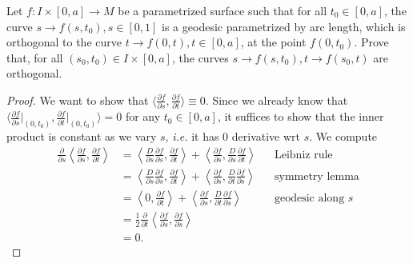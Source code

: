 \documentclass[12pt]{article}
\begin{document}
\begin{problem}[do Carmo 3.10]
	Let $ f: I \times [0,a] \to M$ be a parametrized surface such that for all $ t_0 \in [0,a]$, the curve $ s \to f(s,t_0), s \in [0,1]$ is a geodesic parametrized by arc length, which is orthogonal to the curve $ t \to f(0,t), t \in [0,a]$, at the point $ f(0,t_0)$. Prove that, for all $ (s_0,t_0) \in I \times [0,a]$, the curves $ s \to f(s,t_0), t \to f(s_0,t)$ are orthogonal.
\end{problem}

\begin{proof}
	We want to show that $ \langle \frac{\partial f}{\partial s} , \frac{\partial f}{\partial t}  \rangle \equiv 0$. Since we already know that $ \langle \frac{\partial f}{\partial s} \big|_{(0,t_0)} , \frac{\partial f}{\partial t} \big|_{(0,t_0)}  \rangle = 0$ for any $ t_0 \in [0,a]$, it suffices to show that the inner product is constant as we vary $ s$,  \emph{i.e.} it has 0 derivative wrt $ s$. We compute
\begin{align*}
	\frac{\partial }{\partial s} \left\langle \frac{\partial f}{\partial s} , \frac{\partial f}{\partial t} \right \rangle &= \left\langle \frac{D}{\partial s} \frac{\partial f}{\partial s}, \frac{\partial f}{\partial t}   \right\rangle + \left\langle \frac{\partial f}{\partial s} , \frac{D}{\partial s} \frac{\partial f}{\partial t}  \right\rangle  && \text{Leibniz rule}  \\
	&=  \left\langle \frac{D}{\partial s} \frac{\partial f}{\partial s}, \frac{\partial f}{\partial t}   \right\rangle + \left\langle \frac{\partial f}{\partial s} , \frac{D}{\partial t} \frac{\partial f}{\partial s}  \right\rangle  && \text{symmetry lemma} \\
	&=  \left\langle 0, \frac{\partial f}{\partial t}   \right\rangle + \left\langle \frac{\partial f}{\partial s} , \frac{D}{\partial t} \frac{\partial f}{\partial s}  \right\rangle  && \text{geodesic along }s \\
	&= \frac{1}{2} \frac{\partial }{\partial t} \left\langle \frac{\partial f}{\partial s}, \frac{\partial f}{\partial s}  \right\rangle \\
	&= 0  .
\end{align*}
\end{proof}
\end{document}
